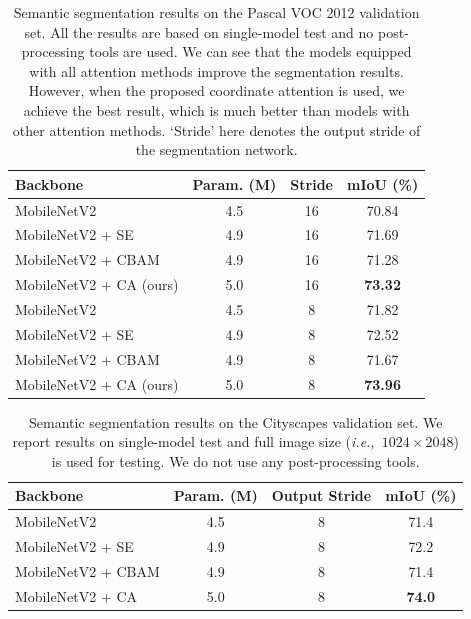 \documentclass[final]{cvpr}
\def\ie{\emph{i.e.,~}}
\begin{document}
\begin{table}[t]
    \centering
    \small
    \setlength\tabcolsep{1.8mm}
    \renewcommand{\arraystretch}{1.1}
     \caption{Semantic segmentation results on the Pascal VOC 2012 validation set.
     All the results are based on single-model test and no post-processing tools are used. We can see that the models equipped with
     all attention methods improve
     the segmentation results.
     However, when the proposed coordinate
     attention is used, we achieve the best
     result, which is much better than
     models with other attention methods.
     `Stride' here denotes the output stride
     of the segmentation network.}
    \begin{tabular}{lccc} \toprule[1pt] %
        Backbone & Param. (M) & Stride & mIoU (\%)  \\ \midrule[1pt]
        MobileNetV2 \cite{sandler2018mobilenetv2} & 4.5 & 16 & 70.84 \\
        MobileNetV2 + SE & 4.9 & 16 & 71.69 \\
        MobileNetV2 + CBAM & 4.9 & 16 & 71.28 \\
        MobileNetV2 + CA (ours) & 5.0 & 16 & \textbf{73.32} \\\midrule[1pt]
        MobileNetV2 \cite{sandler2018mobilenetv2} & 4.5 & 8 & 71.82 \\
        MobileNetV2 + SE & 4.9 & 8 & 72.52 \\
        MobileNetV2 + CBAM & 4.9 & 8 & 71.67 \\
        MobileNetV2 + CA (ours) & 5.0 & 8 & \textbf{73.96} \\
        \bottomrule[1pt]
        \end{tabular}
        \label{tab:seg_voc}
\end{table} 

\begin{table}[t]
    \centering
    \small
    \setlength\tabcolsep{1.1mm}
    \renewcommand{\arraystretch}{1.1}
     \caption{Semantic segmentation results on the Cityscapes \cite{cordts2016cityscapes} validation set. 
     We report results on single-model test and
     full image size (\ie $1024 \times 2048$)
     is used for testing.
     We do not use any post-processing tools.}
    \begin{tabular}{lccc} \toprule[1pt] %
        Backbone & Param. (M) & Output Stride & mIoU (\%)  \\ \midrule[1pt]
        MobileNetV2 & 4.5  & 8  & 71.4 \\
        MobileNetV2 + SE & 4.9  & 8  & 72.2 \\
        MobileNetV2 + CBAM & 4.9  & 8  & 71.4 \\
        MobileNetV2 + CA  & 5.0  & 8  & \textbf{74.0}  \\ 
        \bottomrule[1pt]
        \end{tabular}
        \label{tab:seg_city}
\end{table} 
\end{document}
